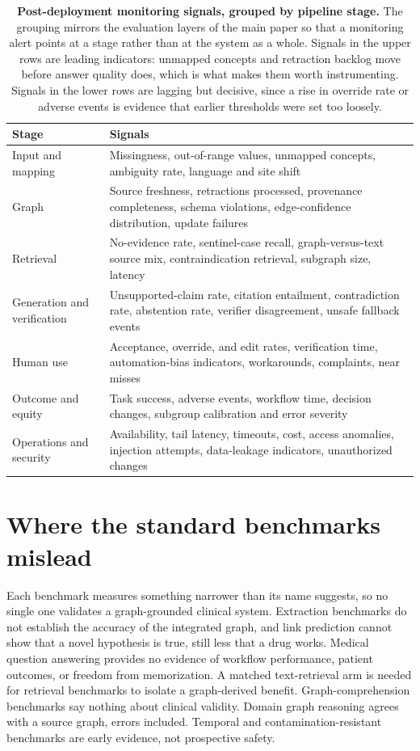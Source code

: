 \documentclass[10pt,a4paper]{article}
\begin{document}
\begin{table}[!ht]
\centering
\caption{\textbf{Post-deployment monitoring signals, grouped by pipeline stage.} The grouping mirrors
the evaluation layers of the main paper so that a monitoring alert points at a stage rather than at
the system as a whole. Signals in the upper rows are leading indicators: unmapped concepts and
retraction backlog move before answer quality does, which is what makes them worth instrumenting.
Signals in the lower rows are lagging but decisive, since a rise in override rate or adverse events
is evidence that earlier thresholds were set too loosely.}
\label{tab:smonitor}
\footnotesize
\begin{tabularx}{\textwidth}{@{}L{3.0cm} Y@{}}
\toprule
\textbf{Stage} & \textbf{Signals} \\
\midrule
Input and mapping & Missingness, out-of-range values, unmapped concepts, ambiguity rate, language and site shift \\
Graph & Source freshness, retractions processed, provenance completeness, schema violations, edge-confidence distribution, update failures \\
Retrieval & No-evidence rate, sentinel-case recall, graph-versus-text source mix, contraindication retrieval, subgraph size, latency \\
Generation and verification & Unsupported-claim rate, citation entailment, contradiction rate, abstention rate, verifier disagreement, unsafe fallback events \\
Human use & Acceptance, override, and edit rates, verification time, automation-bias indicators, workarounds, complaints, near misses \\
Outcome and equity & Task success, adverse events, workflow time, decision changes, subgroup calibration and error severity \\
Operations and security & Availability, tail latency, timeouts, cost, access anomalies, injection attempts, data-leakage indicators, unauthorized changes \\
\bottomrule
\end{tabularx}
\end{table}

\section{Where the standard benchmarks mislead}
\label{s:benchmarks}

Each benchmark measures something narrower than its name suggests, so no single one validates a
graph-grounded clinical system. Extraction benchmarks do not establish the accuracy of the integrated
graph, and link prediction cannot show that a novel hypothesis is true, still less that a drug works.
Medical question answering provides no evidence of workflow performance, patient outcomes, or freedom
from memorization. A matched text-retrieval arm is needed for retrieval benchmarks to isolate a
graph-derived benefit. Graph-comprehension benchmarks say nothing about clinical validity. Domain graph
reasoning agrees with a source graph, errors included. Temporal and contamination-resistant benchmarks
are early evidence, not prospective safety.
\end{document}
